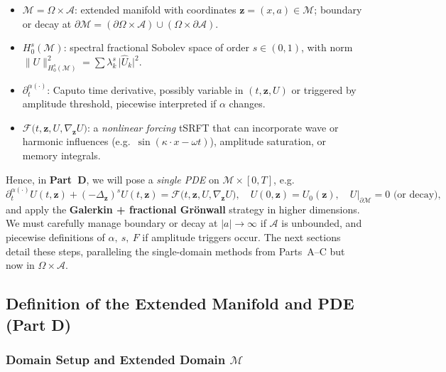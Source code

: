\documentclass[12pt]{article}
\begin{document}
\begin{itemize}
\item $\mathcal{M} = \Omega \times \mathcal{A}$: extended manifold with coordinates 
      $\mathbf{z}=(x,a)\in \mathcal{M}$; boundary or decay at 
      $\partial\mathcal{M}=(\partial\Omega\times\mathcal{A})\cup (\Omega\times \partial\mathcal{A})$.
\item $H_0^s(\mathcal{M})$: spectral fractional Sobolev space of order $s\in(0,1)$, 
      with norm $\|U\|_{H_0^s(\mathcal{M})}^2 = \sum \lambda_k^s \,\lvert \widehat{U}_k\rvert^2$.
\item $\partial_t^{\alpha(\cdot)}$: Caputo time derivative, possibly variable in 
      $(t,\mathbf{z},U)$ or triggered by amplitude threshold, piecewise interpreted if 
      $\alpha$ changes. 
\item $\mathcal{F}\bigl(t,\mathbf{z},U,\nabla_{\mathbf{z}} U\bigr)$: a \emph{nonlinear forcing} 
      tSRFT that can incorporate wave or harmonic influences (e.g.\ $\sin(\kappa\cdot x-\omega t)$), 
      amplitude saturation, or memory integrals. 
\end{itemize}

Hence, in \textbf{Part~D}, we will pose a \emph{single PDE} on $\mathcal{M}\times [0,T]$, 
e.g.
\[
\partial_t^{\alpha(\cdot)} U(t,\mathbf{z})
+
(-\Delta_{\mathbf{z}})^s U(t,\mathbf{z})
=
\mathcal{F}\bigl(t,\mathbf{z},U,\nabla_{\mathbf{z}} U\bigr),
\quad
U(0,\mathbf{z})=U_0(\mathbf{z}),
\quad
U\big|_{\partial\mathcal{M}}=0\text{ (or decay)},
\]
and apply the \textbf{Galerkin + fractional Gr\"onwall} strategy in higher dimensions. 
We must carefully manage boundary or decay at $\lvert a\rvert\to \infty$ if $\mathcal{A}$ 
is unbounded, and piecewise definitions of $\alpha,\ s,\ F$ if amplitude triggers occur. 
The next sections detail these steps, paralleling the single-domain methods from Parts~A--C 
but now in $\Omega\times \mathcal{A}$.

\subsection{Definition of the Extended Manifold and PDE (Part D)}
\label{subsec:extended_manifold_setup}

\subsubsection{Domain Setup and Extended Domain \texorpdfstring{\(\mathcal{M}\)}{}}
\end{document}
